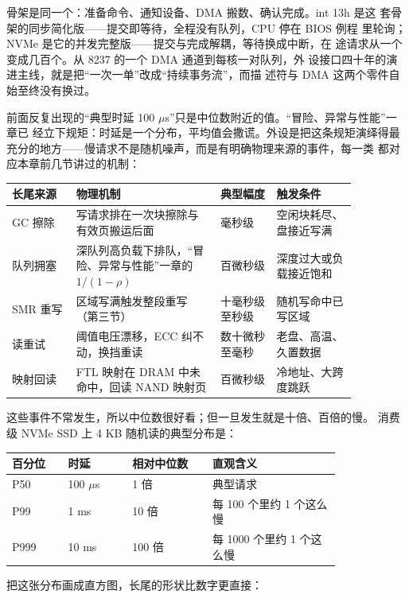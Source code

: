 骨架是同一个：准备命令、通知设备、DMA 搬数、确认完成。int 13h 是这
套骨架的同步简化版——提交即等待，全程没有队列，CPU 停在 BIOS 例程
里轮询；NVMe 是它的并发完整版——提交与完成解耦，等待换成中断，在
途请求从一个变成几百个。从 8237 的一个 DMA 通道到每核一对队列，外
设接口四十年的演进主线，就是把“一次一单”改成“持续事务流”，而描
述符与 DMA 这两个零件自始至终没有换过。

前面反复出现的“典型时延 100 $\mu$s”只是中位数附近的值。“冒险、异常与性能”一章已
经立下规矩：时延是一个分布，平均值会撒谎。外设是把这条规矩演绎得最
充分的地方——慢请求不是随机噪声，而是有明确物理来源的事件，每一类
都对应本章前几节讲过的机制：

\begin{longtable}{L{0.16\linewidth}L{0.36\linewidth}L{0.14\linewidth}L{0.20\linewidth}}
\toprule
长尾来源 & 物理机制 & 典型幅度 & 触发条件 \\
\midrule
GC 擦除 & 写请求排在一次块擦除与有效页搬运后面 & 毫秒级 & 空闲块耗尽、盘接近写满 \\\tablerowrule
队列拥塞 & 深队列高负载下排队，“冒险、异常与性能”一章的 $1/(1-\rho)$ & 百微秒级 & 深度过大或负载接近饱和 \\\tablerowrule
SMR 重写 & 区域写满触发整段重写（第三节） & 十毫秒级至秒级 & 随机写命中已写区域 \\\tablerowrule
读重试 & 阈值电压漂移，ECC 纠不动，换挡重读 & 数十微秒至毫秒 & 老盘、高温、久置数据 \\\tablerowrule
映射回读 & FTL 映射在 DRAM 中未命中，回读 NAND 映射页 & 百微秒级 & 冷地址、大跨度跳跃 \\
\bottomrule
\end{longtable}

这些事件不常发生，所以中位数很好看；但一旦发生就是十倍、百倍的慢。
消费级 NVMe SSD 上 4 KB 随机读的典型分布是：

\begin{longtable}{L{0.14\linewidth}L{0.16\linewidth}L{0.20\linewidth}L{0.32\linewidth}}
\toprule
百分位 & 时延 & 相对中位数 & 直观含义 \\
\midrule
P50 & 100 $\mu$s & 1 倍 & 典型请求 \\\tablerowrule
P99 & 1 ms & 10 倍 & 每 100 个里约 1 个这么慢 \\\tablerowrule
P999 & 10 ms & 100 倍 & 每 1000 个里约 1 个这么慢 \\
\bottomrule
\end{longtable}

把这张分布画成直方图，长尾的形状比数字更直接：

